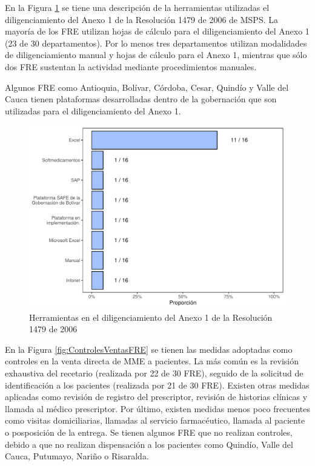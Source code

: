 \documentclass[
]{book}
\begin{document}
En la Figura \ref{fig:HerramientasDiligA1} se tiene una descripción de la herramientas utilizadas el diligenciamiento del Anexo 1 de la Resolución 1479 de 2006 de MSPS. La mayoría de los FRE utilizan hojas de cálculo para el diligenciamiento del Anexo 1 (23 de 30 departamentos). Por lo menos tres departamentos utilizan modalidades de diligenciamiento manual y hojas de cálculo para el Anexo 1, mientras que sólo dos FRE sustentan la actividad mediante procedimientos manuales.

Algunos FRE como Antioquia, Bolívar, Córdoba, Cesar, Quindío y Valle del Cauca tienen plataformas desarrolladas dentro de la gobernación que son utilizadas para el diligenciamiento del Anexo 1.

\begin{figure}
\includegraphics[width=0.85\linewidth]{InformeFinal_files/figure-latex/HerramientasDiligA1-1} \caption{Herramientas en el diligenciamiento del Anexo 1 de la Resolución 1479 de 2006}\label{fig:HerramientasDiligA1}
\end{figure}

En la Figura \ref{fig:ControlesVentasFRE} se tienen las medidas adoptadas como controles en la venta directa de MME a pacientes. La más común es la revisión exhaustiva del recetario (realizada por 22 de 30 FRE), seguido de la solicitud de identificación a los pacientes (realizada por 21 de 30 FRE). Existen otras medidas aplicadas como revisión de registro del prescriptor, revisión de historias clínicas y llamada al médico prescriptor. Por último, existen medidas menos poco frecuentes como visitas domiciliarias, llamadas al servicio farmacéutico, llamada al paciente o posposición de la entrega. Se tienen algunos FRE que no realizan controles, debido a que no realizan dispensación a los pacientes como Quindío, Valle del Cauca, Putumayo, Nariño o Risaralda.
\end{document}
